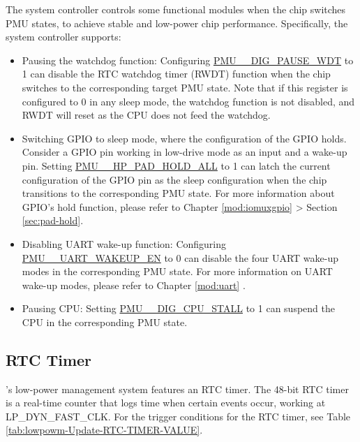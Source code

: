 \documentclass[main\_\_EN.tex]{subfiles}
\begin{document}
The system controller controls some functional modules when the chip switches PMU states, to achieve stable and low-power chip performance. Specifically, the system controller supports:

\begin{itemize}
    \item Pausing the watchdog function: Configuring \hyperref[fielddesc:PMUHPACTIVEDIGPAUSEWDT]{PMU\_\_DIG\_PAUSE\_WDT} to 1 can disable the RTC watchdog timer (RWDT) function when the chip switches to the corresponding target PMU state. Note that if this register is configured to 0 in any sleep mode, the watchdog function is not disabled, and RWDT will reset as the CPU does not feed the watchdog.

    \item Switching GPIO to sleep mode, where the configuration of the GPIO holds. Consider a GPIO pin working in low-drive mode as an input and a wake-up pin. Setting \hyperref[fielddesc:PMUHPACTIVEHPPADHOLDALL]{PMU\_\_HP\_PAD\_HOLD\_ALL} to 1 can latch the current configuration of the GPIO pin as the sleep configuration when the chip transitions to the corresponding PMU state. For more information about GPIO's hold function, please refer to Chapter \ref{mod:iomuxgpio} \textit{} > Section \ref{sec:pad-hold}.

    \item Disabling UART wake-up function: Configuring \hyperref[fielddesc:PMUHPACTIVEUARTWAKEUPEN]{PMU\_\_UART\_WAKEUP\_EN} to 0 can disable the four UART wake-up modes in the corresponding PMU state. For more information on UART wake-up modes, please refer to Chapter \ref{mod:uart} \textit{}.

    \item Pausing CPU: Setting \hyperref[fielddesc:PMUHPACTIVEDIGCPUSTALL]{PMU\_\_DIG\_CPU\_STALL} to 1 can suspend the CPU in the corresponding PMU state.
\end{itemize}

\subsection{RTC Timer}

\chipname{}'s low-power management system features an RTC timer. The 48-bit RTC timer is a real-time counter that logs time when certain events occur, working at  LP\_DYN\_FAST\_CLK. For the trigger conditions for the RTC timer, see Table \ref{tab:lowpowm-Update-RTC-TIMER-VALUE}.
\end{document}
